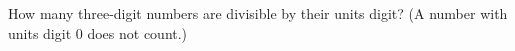 How many three-digit numbers are divisible by their units digit? (A number with units digit $0$ does not count.)
